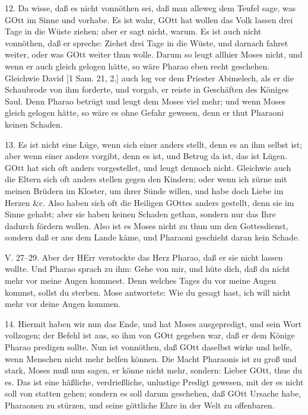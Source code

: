 12. Da wisse, daß es nicht vonnöthen sei, daß man alleweg dem Teufel sage, was GOtt im Sinne und vorhabe. Es ist wahr, GOtt hat wollen das Volk lassen drei Tage in die Wüste ziehen; aber er sagt nicht, warum. Es ist auch nicht vonnöthen, daß er spreche: Ziehet drei Tage in die Wüste, und darnach fahret weiter, oder was GOtt weiter thun wolle. Darum so
leugt allhier Moses nicht, und wenn er auch gleich gelogen hätte, so wäre Pharao eben recht geschehen. Gleichwie David [1 Sam. 21, 2.] auch log vor dem Priester Abimelech, als er die Schaubrode von ihm forderte, und vorgab, er reiste in Geschäften des Königes Saul. Denn Pharao betrügt und leugt dem Moses viel mehr; und wenn Moses gleich gelogen hätte, so wäre es ohne Gefahr gewesen, denn er thut Pharaoni keinen Schaden.

13. Es ist nicht eine Lüge, wenn sich einer anders stellt, denn es an ihm selbst ist; aber wenn einer anders vorgibt, denn es ist, und Betrug da ist, das ist Lügen. GOtt hat sich oft anders vorgestellet, und leugt dennoch nicht. Gleichwie auch die Eltern sich oft anders stellen gegen den Kindern; oder wenn ich zürne mit meinen Brüdern im Kloster, um ihrer Sünde willen, und habe doch Liebe im Herzen \&c. Also haben sich oft die Heiligen GOttes anders gestellt, denn sie im Sinne gehabt; aber sie haben keinen Schaden gethan, sondern nur das Ihre dadurch fördern wollen. Also ist es Moses nicht zu thun um den Gottesdienst, sondern daß er aus dem Lande käme, und Pharaoni geschieht daran kein Schade.

\begin{schriftzitat}
V. 27–29. Aber der HErr verstockte das Herz Pharao, daß er sie nicht lassen wollte. Und Pharao sprach zu ihm: Gehe von mir, und hüte dich, daß du nicht mehr vor meine Augen kommest. Denn welches Tages du vor meine Augen kommst, sollst du sterben. Mose antwortete: Wie du gesagt hast, ich will nicht mehr vor deine Augen kommen.
\end{schriftzitat}

14. Hiermit haben wir nun das Ende, und hat Moses ausgepredigt, und sein Wort vollzogen; der Befehl ist aus, so ihm von GOtt gegeben war, daß er dem Könige Pharao predigen sollte. Nun ist vonnöthen, daß GOtt daselbst wirke und helfe, wenn Menschen nicht mehr helfen können. Die Macht Pharaonis ist zu groß und stark, Moses muß nun sagen, er könne nicht mehr, sondern: Lieber GOtt, thue du es. Das ist eine häßliche, verdrießliche, unlustige Predigt gewesen, mit der es nicht soll von statten gehen; sondern es soll darum geschehen, daß GOtt Ursache habe, Pharaonen zu stürzen, und seine göttliche Ehre in der Welt zu offenbaren.

